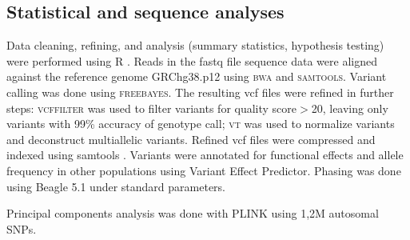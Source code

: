 

\subsection*{Statistical and sequence analyses}
Data cleaning, refining, and analysis (summary statistics, hypothesis testing) were performed using R \cite{R}.
Reads in the fastq file sequence data were aligned against the reference genome GRChg38.p12 using \textsc{bwa}\cite{li2013aligning} and \textsc{samtools}\cite{li2011statistical}. Variant calling was done using \textsc{freebayes}\cite{garrison2012haplotype}. The resulting vcf files were refined in further steps: \textsc{vcffilter} \cite{vcflib} was used to filter variants for quality score$>$20, leaving only variants with 99\% accuracy of genotype call; \textsc{vt}\cite{tan2015unified} was used to normalize variants and deconstruct multiallelic variants. Refined vcf files were compressed and indexed using samtools \cite{li2011statistical}. Variants were annotated for functional effects and allele frequency in other populations using Variant Effect Predictor\cite{mclaren2016ensembl}. Phasing was done using Beagle 5.1\cite{browning2018one} under standard parameters.  

Principal components analysis was done with PLINK\cite{chang2015second} using 1,2M autosomal SNPs. 

